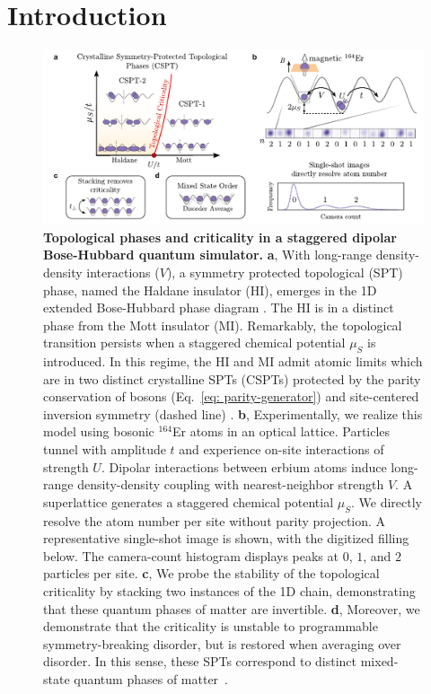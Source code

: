 \documentclass[preprint,superscriptaddress,floatfix, nofootinbib]{revtex4-2}
\begin{document}
\section{Introduction} 

\begin{figure}
    \centering
    \includegraphics[width=\textwidth]{figures/Fig_intro_v4.pdf}
    \caption{\textbf{Topological phases and criticality in a staggered dipolar Bose-Hubbard quantum simulator.}
    \textbf{a}, With long-range density-density interactions ($V$), a symmetry protected topological (SPT) phase, named the Haldane insulator (HI), emerges in the 1D extended Bose-Hubbard phase diagram \cite{Torre2006, Berg2008}.
    The HI is in a distinct phase from the Mott insulator (MI). Remarkably, the topological transition persists when a staggered chemical potential $\mu_S$ is introduced. In this regime, the HI and MI admit atomic limits which are in two distinct crystalline SPTs (CSPTs) protected by the parity conservation of bosons (Eq.~\eqref{eq: parity-generator}) and site-centered inversion symmetry (dashed line) \cite{Fuji2015}.
    \textbf{b}, Experimentally, we realize this model using bosonic $^{164}$Er atoms in an optical lattice. Particles tunnel with amplitude $t$ and experience on-site interactions of strength $U$. Dipolar interactions between erbium atoms induce long-range density-density coupling with nearest-neighbor strength $V$. A superlattice generates a staggered chemical potential $\mu_S$. We directly resolve the atom number per site without parity projection. A representative single-shot image is shown, with the digitized filling below. The camera-count histogram displays peaks at $0$, $1$, and $2$ particles per site.
    \textbf{c}, We probe the stability of the topological criticality by stacking two instances of the 1D chain, demonstrating that these quantum phases of matter are invertible.
    \textbf{d}, Moreover, we demonstrate that the criticality is unstable to programmable symmetry-breaking disorder, but is restored when averaging over disorder. In this sense, these SPTs correspond to distinct mixed-state quantum phases of matter~\cite{Ma2023}.
    }
    \label{fig: setup}
\end{figure}
\end{document}
